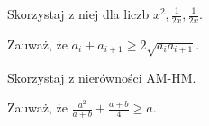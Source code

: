 

\begin{hints_list}
	\item Skorzystaj z niej dla liczb $x^2, \frac{1}{2x}, \frac{1}{2x}$.
	\item Zauważ, że $a_i + a_{i + 1} \geqslant 2\sqrt{a_ia_{i + 1}}$.
	\item Skorzystaj z nierówności AM-HM.
	\item *
	\item Zauważ, że $\frac{a^2}{a + b} + \frac{a + b}{4} \geqslant a$.
\end{hints_list}